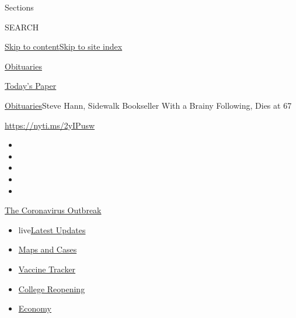 Sections

SEARCH

\protect\hyperlink{site-content}{Skip to
content}\protect\hyperlink{site-index}{Skip to site index}

\href{https://www.nytimes3xbfgragh.onion/section/obituaries}{Obituaries}

\href{https://myaccount.nytimes3xbfgragh.onion/auth/login?response_type=cookie\&client_id=vi}{}

\href{https://www.nytimes3xbfgragh.onion/section/todayspaper}{Today's
Paper}

\href{/section/obituaries}{Obituaries}\textbar{}Steve Hann, Sidewalk
Bookseller With a Brainy Following, Dies at 67

\url{https://nyti.ms/2yIPusw}

\begin{itemize}
\item
\item
\item
\item
\item
\end{itemize}

\href{https://www.nytimes3xbfgragh.onion/news-event/coronavirus?action=click\&pgtype=Article\&state=default\&region=TOP_BANNER\&context=storylines_menu}{The
Coronavirus Outbreak}

\begin{itemize}
\tightlist
\item
  live\href{https://www.nytimes3xbfgragh.onion/2020/08/04/world/coronavirus-covid-19.html?action=click\&pgtype=Article\&state=default\&region=TOP_BANNER\&context=storylines_menu}{Latest
  Updates}
\item
  \href{https://www.nytimes3xbfgragh.onion/interactive/2020/us/coronavirus-us-cases.html?action=click\&pgtype=Article\&state=default\&region=TOP_BANNER\&context=storylines_menu}{Maps
  and Cases}
\item
  \href{https://www.nytimes3xbfgragh.onion/interactive/2020/science/coronavirus-vaccine-tracker.html?action=click\&pgtype=Article\&state=default\&region=TOP_BANNER\&context=storylines_menu}{Vaccine
  Tracker}
\item
  \href{https://www.nytimes3xbfgragh.onion/2020/08/02/us/covid-college-reopening.html?action=click\&pgtype=Article\&state=default\&region=TOP_BANNER\&context=storylines_menu}{College
  Reopening}
\item
  \href{https://www.nytimes3xbfgragh.onion/live/2020/08/03/business/stock-market-today-coronavirus?action=click\&pgtype=Article\&state=default\&region=TOP_BANNER\&context=storylines_menu}{Economy}
\end{itemize}

